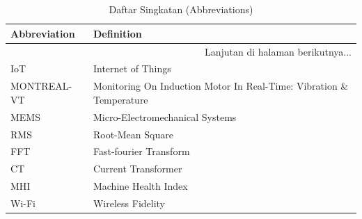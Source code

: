 \documentclass{elsinta}
\begin{document}
\section{\AbbrevTitle}
\begin{longtable}{|p{4cm}|p{11cm}|} %
    \caption{Daftar Singkatan (Abbreviations)}\\
    \hline
    \textbf{Abbreviation} & \textbf{Definition} \\
    \hline
    \endhead %
    
    \hline 
    \multicolumn{2}{|r|}{Lanjutan di halaman berikutnya...} \\ 
    \endfoot %
    
    \hline
    \endlastfoot %

    IoT & Internet of Things \\
    \hline
    MONTREAL-VT & Monitoring On Induction Motor In Real-Time: Vibration \& Temperature\\
    \hline
    MEMS & Micro-Electromechanical Systems\\
    \hline
    RMS & Root-Mean Square \\
    \hline
    FFT & Fast-fourier Transform\\
    \hline
    CT & Current Transformer\\
    \hline
    MHI & Machine Health Index\\
    \hline
    Wi-Fi & Wireless Fidelity\\
    \hline


\end{longtable}
\end{document}
